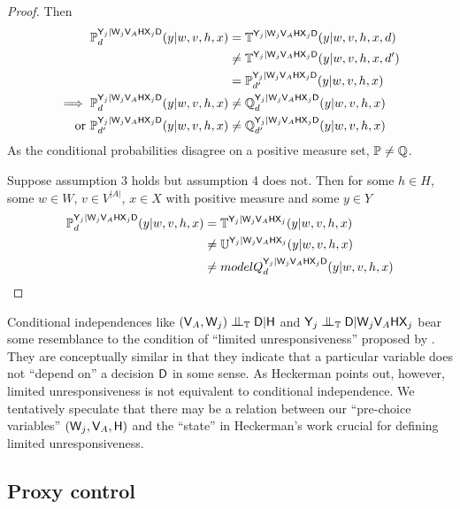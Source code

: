 \begin{proof}
Then
\begin{align}
    \mathbb{P}_d^{\mathsf{Y}_j|\mathsf{W}_j\mathsf{V}_A\mathsf{HX}_j\mathsf{D}}(y|w,v,h,x)&= \mathbb{T}^{\mathsf{Y}_j|\mathsf{W}_j\mathsf{V}_A\mathsf{HX}_j\mathsf{D}}(y|w,v,h,x,d)\\
    &\neq \mathbb{T}^{\mathsf{Y}_j|\mathsf{W}_j\mathsf{V}_A\mathsf{HX}_j\mathsf{D}}(y|w,v,h,x,d')\\
    &= \mathbb{P}_{d'}^{\mathsf{Y}_j|\mathsf{W}_j\mathsf{V}_A\mathsf{HX}_j\mathsf{D}}(y|w,v,h,x)\\
    \implies \mathbb{P}_d^{\mathsf{Y}_j|\mathsf{W}_j\mathsf{V}_A\mathsf{HX}_j\mathsf{D}}(y|w,v,h,x) &\neq \mathbb{Q}_d^{\mathsf{Y}_j|\mathsf{W}_j\mathsf{V}_A\mathsf{HX}_j\mathsf{D}}(y|w,v,h,x)\\
    \text{or } \mathbb{P}_{d'}^{\mathsf{Y}_j|\mathsf{W}_j\mathsf{V}_A\mathsf{HX}_j\mathsf{D}}(y|w,v,h,x) &\neq \mathbb{Q}_{d'}^{\mathsf{Y}_j|\mathsf{W}_j\mathsf{V}_A\mathsf{HX}_j\mathsf{D}}(y|w,v,h,x)
\end{align}
As the conditional probabilities disagree on a positive measure set, $\mathbb{P}\neq\mathbb{Q}$.

Suppose assumption 3 holds but assumption 4 does not. Then for some $h\in H$, some $w\in W$, $v\in V^{|A|}$, $x\in X$ with positive measure and some $y\in Y$
\begin{align}
    \mathbb{P}_d^{\mathsf{Y}_j|\mathsf{W}_j\mathsf{V}_A\mathsf{HX}_j\mathsf{D}}(y|w,v,h,x)&= \mathbb{T}^{\mathsf{Y}_j|\mathsf{W}_j\mathsf{V}_A\mathsf{HX}_j}(y|w,v,h,x)\\
    &\neq \mathbb{U}^{\mathsf{Y}_j|\mathsf{W}_j\mathsf{V}_A\mathsf{HX}_j}(y|w,v,h,x)\\
    &\neq model{Q}_d^{\mathsf{Y}_j|\mathsf{W}_j\mathsf{V}_A\mathsf{HX}_j\mathsf{D}}(y|w,v,h,x)
\end{align}
\end{proof}

Conditional independences like $(\RV{V}_A,\RV{W}_j)\CI_{\model{T}} \RV{D}|\RV{H}$ and $\RV{Y}_j\CI_{\model{T}}\RV{D}|\RV{W}_j\RV{V}_A\RV{HX}_j$ bear some resemblance to the condition of ``limited unresponsiveness'' proposed by \citet{heckerman_decision-theoretic_1995}. They are conceptually similar in that they indicate that a particular variable does not ``depend on'' a decision $\mathsf{D}$ in some sense. As Heckerman points out, however, limited unresponsiveness is not equivalent to conditional independence. We tentatively speculate that there may be a relation between our ``pre-choice variables'' $(\mathsf{W}_j,\mathsf{V}_A,\mathsf{H})$ and the ``state'' in Heckerman's work crucial for defining limited unresponsiveness.

\subsection{Proxy control}

